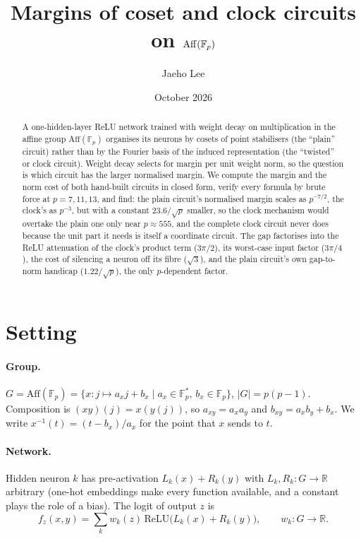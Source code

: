 \documentclass[11pt]{article}
\title{Margins of coset and clock circuits on $\Aff(\F_p)$}
\author{Jaeho Lee}
\date{October 2026}
\theoremstyle{remark}
\newcommand{\F}{\mathbb{F}}
\newcommand{\R}{\mathbb{R}}
\newcommand{\Aff}{\mathrm{Aff}}
\newcommand{\relu}{\mathrm{ReLU}}
\newcommand{\abs}[1]{\lvert #1 \rvert}
\begin{document}
\maketitle

\begin{abstract}
A one-hidden-layer ReLU network trained with weight decay on multiplication in the affine group $\Aff(\F_p)$ organises its
neurons by cosets of point stabilisers (the ``plain'' circuit) rather than by the Fourier basis of the induced representation
(the ``twisted'' or clock circuit). Weight decay selects for margin per unit weight norm, so the question is which circuit has
the larger normalised margin. We compute the margin and the norm cost of both hand-built circuits in closed form, verify every
formula by brute force at $p = 7, 11, 13$, and find: the plain circuit's normalised margin scales as $p^{-7/2}$, the clock's as
$p^{-3}$, but with a constant $23.6/\sqrt{p}$ smaller, so the clock mechanism would overtake the plain one only near $p \approx 555$,
and the complete clock circuit never does because the unit part it needs is itself a coordinate circuit. The gap factorises into
the ReLU attenuation of the clock's product term ($3\pi/2$), its worst-case input factor ($3\pi/4$), the cost of silencing a neuron
off its fibre ($\sqrt{3}$), and the plain circuit's own gap-to-norm handicap ($1.22/\sqrt{p}$), the only $p$-dependent factor.
\end{abstract}

\section{Setting}

\paragraph{Group.} $G = \Aff(\F_p) = \{x : j \mapsto a_x j + b_x \mid a_x \in \F_p^{*},\, b_x \in \F_p\}$, $\abs{G} = p(p-1)$.
Composition is $(xy)(j) = x(y(j))$, so $a_{xy} = a_x a_y$ and $b_{xy} = a_x b_y + b_x$. We write $x^{-1}(t) = (t - b_x)/a_x$ for the
point that $x$ sends to $t$.

\paragraph{Network.} Hidden neuron $k$ has pre-activation $L_k(x) + R_k(y)$ with $L_k, R_k : G \to \R$ arbitrary (one-hot embeddings
make every function available, and a constant plays the role of a bias). The logit of output $z$ is
\[
f_z(x,y) = \sum_k w_k(z)\, \relu\bigl(L_k(x) + R_k(y)\bigr), \qquad w_k : G \to \R .
\]
\end{document}
